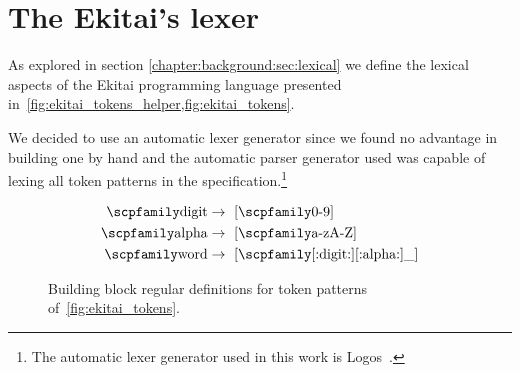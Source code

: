 \documentclass[
  oneside,
  english,
  coorientadorbanca,
  noabntexcite
]{ufsc-thesis-rn46-2019}
\newcommand{\code}[1]{\text{\scpfamily\setlength\spaceskip{0.35em}#1}}
\begin{document}
\section{The Ekitai's lexer}

As explored in section \cref{chapter:background:sec:lexical} we define the lexical aspects of the Ekitai programming language presented in~\cref{fig:ekitai_tokens_helper,fig:ekitai_tokens}.

We decided to use an automatic lexer generator since we found no advantage in building one by hand and the automatic parser generator used was capable of lexing all token patterns in the specification.\footnote{The automatic lexer generator used in this work is Logos~\cite{logos2020}.}

\begin{figure}[ht]
  \small
  \begin{align*}
    \code{digit} & \rightarrow \ [\code{0-9}]                  \\
    \code{alpha} & \rightarrow \ [\code{a-zA-Z}]               \\
    \code{word}  & \rightarrow \ [\code{[:digit:][:alpha:]\_}]
  \end{align*}
  \caption{
    Building block regular definitions for token patterns of~\cref{fig:ekitai_tokens}.
  }\label{fig:ekitai_tokens_helper}
\end{figure}
\end{document}

